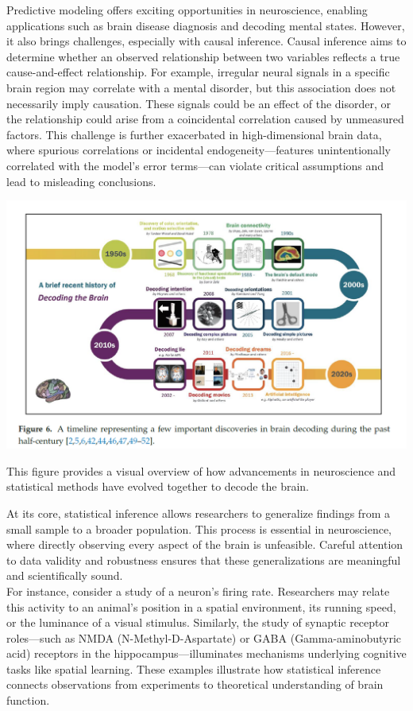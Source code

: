 \documentclass[
]{article}
\begin{document}
Predictive modeling offers exciting opportunities in neuroscience,
enabling applications such as brain disease diagnosis and decoding
mental states. However, it also brings challenges, especially with
causal inference. Causal inference aims to determine whether an observed
relationship between two variables reflects a true cause-and-effect
relationship. For example, irregular neural signals in a specific brain
region may correlate with a mental disorder, but this association does
not necessarily imply causation. These signals could be an effect of the
disorder, or the relationship could arise from a coincidental
correlation caused by unmeasured factors. This challenge is further
exacerbated in high-dimensional brain data, where spurious correlations
or incidental endogeneity---features unintentionally correlated with the
model's error terms---can violate critical assumptions and lead to
misleading conclusions.

\includegraphics{stat_developments_history.png}

This figure provides a visual overview of how advancements in
neuroscience and statistical methods have evolved together to decode the
brain.

At its core, statistical inference allows researchers to generalize
findings from a small sample to a broader population. This process is
essential in neuroscience, where directly observing every aspect of the
brain is unfeasible. Careful attention to data validity and robustness
ensures that these generalizations are meaningful and scientifically
sound.\\
For instance, consider a study of a neuron's firing rate. Researchers
may relate this activity to an animal's position in a spatial
environment, its running speed, or the luminance of a visual stimulus.
Similarly, the study of synaptic receptor roles---such as NMDA
(N-Methyl-D-Aspartate) or GABA (Gamma-aminobutyric acid) receptors in
the hippocampus---illuminates mechanisms underlying cognitive tasks like
spatial learning. These examples illustrate how statistical inference
connects observations from experiments to theoretical understanding of
brain function.\\
\end{document}
